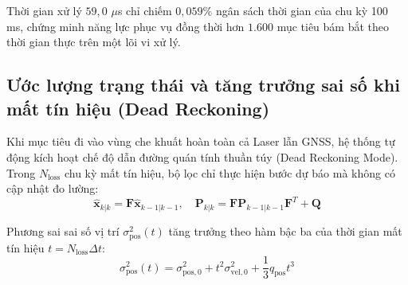 \begin{table}[H]
\centering
\caption{Ngân sách chi tiết thời gian xử lý từng công đoạn trong chu kỳ 100 ms (10 Hz)}
\label{tab:pipeline-execution-timing-budget}
\end{table}

Thời gian xử lý $59{,}0$ $\mu$s chỉ chiếm $0{,}059\%$ ngân sách thời gian của chu kỳ 100 ms, chứng minh năng lực phục vụ đồng thời hơn $1.600$ mục tiêu bám bắt theo thời gian thực trên một lõi vi xử lý.

\subsection{Ước lượng trạng thái và tăng trưởng sai số khi mất tín hiệu (Dead Reckoning)}

\hspace{0.5cm} Khi mục tiêu đi vào vùng che khuất hoàn toàn cả Laser lẫn GNSS, hệ thống tự động kích hoạt chế độ dẫn đường quán tính thuần túy (Dead Reckoning Mode). Trong $N_{\text{loss}}$ chu kỳ mất tín hiệu, bộ lọc chỉ thực hiện bước dự báo mà không có cập nhật đo lường:
\begin{equation}
\hat{\mathbf{x}}_{k|k} = \mathbf{F} \hat{\mathbf{x}}_{k-1|k-1}, \quad \mathbf{P}_{k|k} = \mathbf{F} \mathbf{P}_{k-1|k-1} \mathbf{F}^T + \mathbf{Q}
\label{eq:dead-reckoning-state-update}
\end{equation}

Phương sai sai số vị trí $\sigma_{\text{pos}}^2(t)$ tăng trưởng theo hàm bậc ba của thời gian mất tín hiệu $t = N_{\text{loss}} \Delta t$:
\begin{equation}
\sigma_{\text{pos}}^2(t) = \sigma_{\text{pos}, 0}^2 + t^2 \sigma_{\text{vel}, 0}^2 + \frac{1}{3} q_{\text{pos}} t^3
\label{eq:cubic-covariance-growth-dead-reckoning}
\end{equation}

